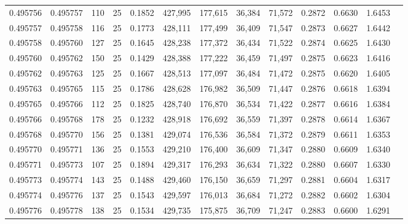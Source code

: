 \begin{tabular}{rrrrrrrrrrrrr}
0.495756 & 0.495757 &   110 &  25 &                                     0.1852 & 427,995 & 177,615 &  36,384 &  71,572 & 0.2872 & 0.6630 & 1.6453 \\
0.495757 & 0.495758 &   116 &  25 &                                     0.1773 & 428,111 & 177,499 &  36,409 &  71,547 & 0.2873 & 0.6627 & 1.6442 \\
0.495758 & 0.495760 &   127 &  25 &                                     0.1645 & 428,238 & 177,372 &  36,434 &  71,522 & 0.2874 & 0.6625 & 1.6430 \\
0.495760 & 0.495762 &   150 &  25 &                                     0.1429 & 428,388 & 177,222 &  36,459 &  71,497 & 0.2875 & 0.6623 & 1.6416 \\
0.495762 & 0.495763 &   125 &  25 &                                     0.1667 & 428,513 & 177,097 &  36,484 &  71,472 & 0.2875 & 0.6620 & 1.6405 \\
0.495763 & 0.495765 &   115 &  25 &                                     0.1786 & 428,628 & 176,982 &  36,509 &  71,447 & 0.2876 & 0.6618 & 1.6394 \\
0.495765 & 0.495766 &   112 &  25 &                                     0.1825 & 428,740 & 176,870 &  36,534 &  71,422 & 0.2877 & 0.6616 & 1.6384 \\
0.495766 & 0.495768 &   178 &  25 &                                     0.1232 & 428,918 & 176,692 &  36,559 &  71,397 & 0.2878 & 0.6614 & 1.6367 \\
0.495768 & 0.495770 &   156 &  25 &                                     0.1381 & 429,074 & 176,536 &  36,584 &  71,372 & 0.2879 & 0.6611 & 1.6353 \\
0.495770 & 0.495771 &   136 &  25 &                                     0.1553 & 429,210 & 176,400 &  36,609 &  71,347 & 0.2880 & 0.6609 & 1.6340 \\
0.495771 & 0.495773 &   107 &  25 &                                     0.1894 & 429,317 & 176,293 &  36,634 &  71,322 & 0.2880 & 0.6607 & 1.6330 \\
0.495773 & 0.495774 &   143 &  25 &                                     0.1488 & 429,460 & 176,150 &  36,659 &  71,297 & 0.2881 & 0.6604 & 1.6317 \\
0.495774 & 0.495776 &   137 &  25 &                                     0.1543 & 429,597 & 176,013 &  36,684 &  71,272 & 0.2882 & 0.6602 & 1.6304 \\
0.495776 & 0.495778 &   138 &  25 &                                     0.1534 & 429,735 & 175,875 &  36,709 &  71,247 & 0.2883 & 0.6600 & 1.6291 \\

\end{tabular}
